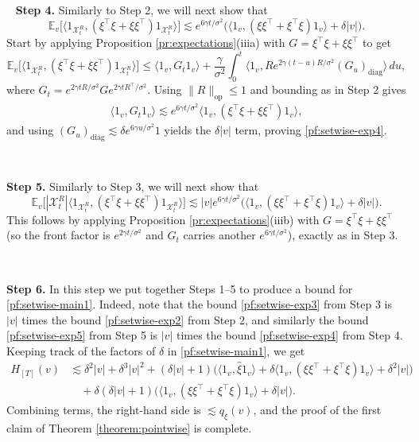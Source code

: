 \documentclass[11pt,reqno]{amsart}
\numberwithin{equation}{section}
\theoremstyle{definition}
\def\E{{\mathbb E}}
\def\X{{\mathcal X}}
\begin{document}
{ \ } \noindent\textbf{Step 4.} Similarly to Step 2, we will next show that \begin{equation} \E_v\big[ \langle 1_{\X_t^{R}}, (\xi^\top \xi + \xi \xi^\top) 1_{\X_t^{R}}\rangle \big] \lesssim e^{6\gamma t/\sigma^2}\Big(\langle 1_v,(\xi\xi^\top + \xi^\top \xi) 1_v \rangle + \delta |v|\Big). \label{pf:setwise-exp4} \end{equation} Start by applying Proposition \ref{pr:expectations}(iiia) with $G=\xi^\top \xi + \xi \xi^\top$ to get \begin{equation} \E_v\big[ \langle 1_{\X_t^{R}}, (\xi^\top \xi + \xi \xi^\top) 1_{\X_t^{R}}\rangle \big] \le \langle 1_v,G_t 1_v\rangle + \frac{\gamma}{\sigma^2} \int_0^t \Big\langle 1_v, R e^{2\gamma (t-u)R/\sigma^2} (G_u)_{\mathrm{diag}}\Big\rangle \,du, \label{pf:setwise-step4-1} \end{equation} where $G_t = e^{2\gamma t R/\sigma^2}Ge^{2\gamma t R^\top/\sigma^2}$. Using $\|R\|_{\mathrm{op}}\le 1$ and bounding as in Step 2 gives \begin{align} \langle 1_v,G_t 1_v\rangle \lesssim e^{6\gamma t/\sigma^2}\langle 1_v,(\xi^\top \xi + \xi \xi^\top)1_v\rangle, \label{pf:setwise-step4-2} \end{align} and using $(G_u)_{\mathrm{diag}}\lesssim \delta e^{6\gamma u/\sigma^2}1$ yields the $\delta|v|$ term, proving \eqref{pf:setwise-exp4}. 

{ \ }

\noindent\textbf{Step 5.} Similarly to Step 3, we will next show that \begin{equation} \E_v\big[|\X_t^{R}| \langle 1_{\X_t^{R}}, (\xi^\top \xi + \xi \xi^\top) 1_{\X_t^{R}}\rangle \big] \lesssim |v| e^{6\gamma t/\sigma^2}\Big( \langle 1_v,(\xi\xi^\top + \xi^\top \xi) 1_v \rangle + \delta |v|\Big). \label{pf:setwise-exp5} \end{equation} This follows by applying Proposition \ref{pr:expectations}(iiib) with $G=\xi^\top\xi+\xi\xi^\top$ (so the front factor is $e^{2\gamma t/\sigma^2}$ and $G_t$ carries another $e^{6\gamma t/\sigma^2}$), exactly as in Step 3. 

{ \ }

\noindent\textbf{Step 6.} In this step we put together Steps 1--5 to produce a bound for \eqref{pf:setwise-main1}. Indeed, note that the bound \eqref{pf:setwise-exp3} from Step 3 is $|v|$ times the bound \eqref{pf:setwise-exp2} from Step 2, and similarly the bound \eqref{pf:setwise-exp5} from Step 5 is $|v|$ times the bound \eqref{pf:setwise-exp4} from Step 4. Keeping track of the factors of $\delta$ in \eqref{pf:setwise-main1}, we get \begin{align*} H_{[T]}(v) &\lesssim \delta^2 |v| +\delta^3 |v|^2 + (\delta|v|+1)\Big(\langle 1_v,\widehat{\xi} 1_v\rangle + \delta \langle 1_v,(\xi\xi^\top + \xi^\top \xi) 1_v \rangle + \delta^2|v|\Big) \\ &\quad + \delta(\delta|v|+1) \Big( \langle 1_v,(\xi\xi^\top + \xi^\top \xi) 1_v \rangle + \delta|v| \Big). \end{align*} Combining terms, the right-hand side is $\lesssim q_\xi(v)$, and the proof of the first claim of Theorem \ref{theorem:pointwise} is complete.
\end{document}
